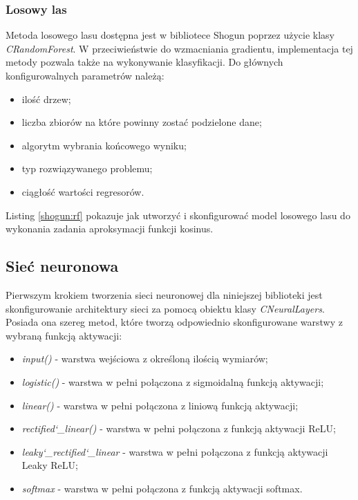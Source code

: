 
\subsubsection{Losowy las}
Metoda losowego lasu dostępna jest w bibliotece Shogun poprzez użycie klasy \textit{CRandomForest}. W przeciwieństwie do wzmacniania gradientu, implementacja tej metody pozwala także na wykonywanie klasyfikacji. Do głównych konfigurowalnych parametrów należą:

\begin{itemize}
	\item ilość drzew;
	\item liczba zbiorów na które powinny zostać podzielone dane;
	\item algorytm wybrania końcowego wyniku;
	\item typ rozwiązywanego problemu;
	\item ciągłość wartości regresorów.
\end{itemize}

Listing \ref{shogun:rf} pokazuje jak utworzyć i skonfigurować model losowego lasu do wykonania zadania aproksymacji funkcji kosinus.


\subsection{Sieć neuronowa}

Pierwszym krokiem tworzenia sieci neuronowej dla niniejszej biblioteki jest skonfigurowanie architektury sieci za pomocą obiektu klasy \textit{CNeuralLayers}. Posiada ona szereg metod, które tworzą odpowiednio skonfigurowane warstwy z wybraną funkcją aktywacji:

\begin{itemize}
	\item \textit{input()} - warstwa wejściowa z określoną ilością wymiarów;
	\item \textit{logistic()} - warstwa w pełni połączona z sigmoidalną funkcją aktywacji;
	\item \textit{linear()} - warstwa w pełni połączona z liniową funkcją aktywacji;
	\item \textit{rectified\char`_linear()} - warstwa w pełni połączona z funkcją aktywacji ReLU;
	\item \textit{leaky\char`_rectified\char`_linear} - warstwa w pełni połączona z funkcją aktywacji Leaky ReLU;
	\item \textit{softmax} - warstwa w pełni połączona z funkcją aktywacji softmax. 
\end{itemize}

